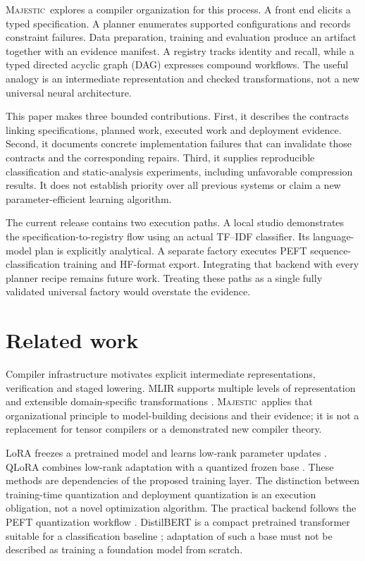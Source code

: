 \documentclass[11pt,a4paper]{article}
\newcommand{\sys}{\textsc{Majestic}}
\begin{document}
\sys\ explores a compiler organization for this process. A front end elicits a
typed specification. A planner enumerates supported configurations and records
constraint failures. Data preparation, training and evaluation produce an
artifact together with an evidence manifest. A registry tracks identity and
recall, while a typed directed acyclic graph (DAG) expresses compound workflows.
The useful analogy is an intermediate representation and checked transformations,
not a new universal neural architecture.

This paper makes three bounded contributions. First, it describes the contracts
linking specifications, planned work, executed work and deployment evidence.
Second, it documents concrete implementation failures that can invalidate those
contracts and the corresponding repairs. Third, it supplies reproducible
classification and static-analysis experiments, including unfavorable compression
results. It does not establish priority over all previous systems or claim a new
parameter-efficient learning algorithm.

The current release contains two execution paths. A local studio demonstrates
the specification-to-registry flow using an actual TF--IDF classifier. Its
language-model plan is explicitly analytical. A separate factory executes PEFT
sequence-classification training and HF-format export. Integrating that backend
with every planner recipe remains future work. Treating these paths as a single
fully validated universal factory would overstate the evidence.

\section{Related work}
Compiler infrastructure motivates explicit intermediate representations,
verification and staged lowering. MLIR supports multiple levels of representation
and extensible domain-specific transformations \cite{mlir}. \sys\ applies that
organizational principle to model-building decisions and their evidence; it is
not a replacement for tensor compilers or a demonstrated new compiler theory.

LoRA freezes a pretrained model and learns low-rank parameter updates
\cite{lora}. QLoRA combines low-rank adaptation with a quantized frozen base
\cite{qlora}. These methods are dependencies of the proposed training layer.
The distinction between training-time quantization and deployment quantization
is an execution obligation, not a novel optimization algorithm. The practical
backend follows the PEFT quantization workflow \cite{peft}. DistilBERT is a
compact pretrained transformer suitable for a classification baseline
\cite{distilbert}; adaptation of such a base must not be described as training
a foundation model from scratch.
\end{document}
